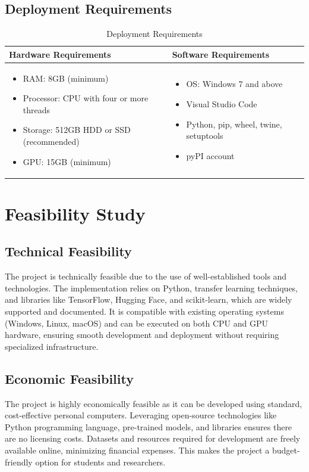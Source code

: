 \subsection{Deployment Requirements}
\begin{table}[h]
\centering
\caption{Deployment Requirements}
\renewcommand{\arraystretch}{1.25} %
\setlength{\tabcolsep}{8pt} %
\begin{tabular}{|>{\raggedright\arraybackslash}p{6.5cm}|>{\raggedright\arraybackslash}p{6.5cm}|}
\hline
\textbf{Hardware Requirements} & \textbf{Software Requirements} \\
\hline
\begin{itemize}
    \item RAM: 8GB (minimum)
    \item Processor: CPU with four or more threads
    \item Storage: 512GB HDD or SSD (recommended)
    \item GPU: 15GB (minimum)
\end{itemize} & 
\begin{itemize}
    \item OS: Windows 7 and above
    \item Visual Studio Code
    \item Python, pip, wheel, twine, setuptools
    \item pyPI account
\end{itemize} \\
\hline
\end{tabular}
\label{tab:deployment}
\end{table}


\section{Feasibility Study}
\subsection{Technical Feasibility}
The project is technically feasible due to the use of well-established tools and technologies. The implementation relies on Python, transfer learning techniques, and libraries like TensorFlow, Hugging Face, and scikit-learn, which are widely supported and documented. It is compatible with existing operating systems (Windows, Linux, macOS) and can be executed on both CPU and GPU hardware, ensuring smooth development and deployment without requiring specialized infrastructure.
\subsection{Economic Feasibility}
The project is highly economically feasible as it can be developed using standard, cost-effective personal computers. Leveraging open-source technologies like Python programming language, pre-trained models, and libraries ensures there are no licensing costs. Datasets and resources required for development are freely available online, minimizing financial expenses. This makes the project a budget-friendly option for students and researchers.
